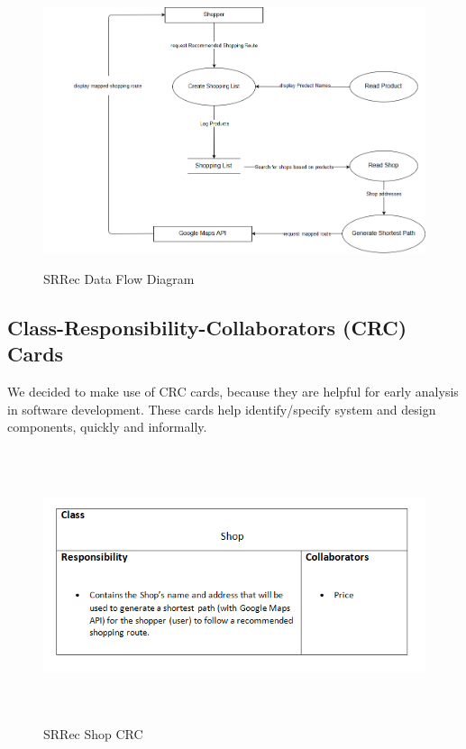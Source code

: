 \documentclass[12pt]{article}
\begin{document}
\begin{figure}[H]
  \includegraphics[width=\textwidth ,height=8cm]{DFD.png}
  \centering
  \caption{SRRec Data Flow Diagram}
  \label{fig:Data Flow Diagram}
\end{figure}

\subsection{Class-Responsibility-Collaborators (CRC) Cards}
We decided to make use of CRC cards, because they are helpful for early analysis in software development. These cards help identify/specify system and design components, quickly and informally.\\

\begin{figure}[H]
  \includegraphics[width=\textwidth ,height=8cm]{ShopCRC.png}
  \centering
  \caption{SRRec Shop CRC}
  \label{fig:Shop CRC}
\end{figure}
\end{document}
